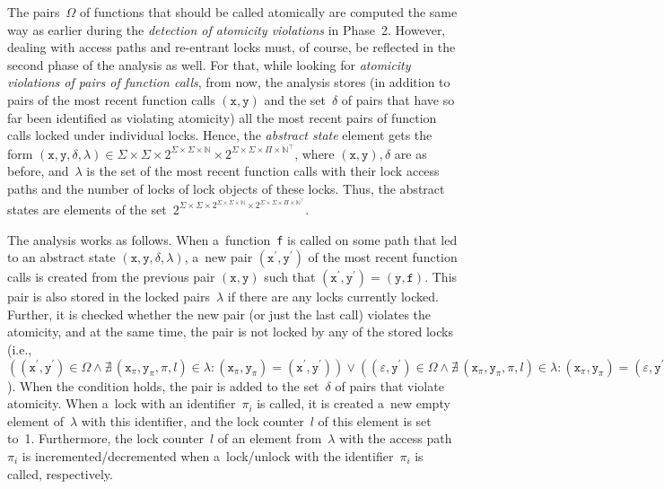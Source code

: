 The pairs~$ \Omega $ of functions that should be called atomically are computed the same way as earlier during the \emph{detection of atomicity violations} in Phase~2. However, dealing with access paths and re-entrant locks must, of course, be reflected in the second phase of the analysis as well. For that, while looking for \emph{atomicity violations of pairs of function calls}, from now, the analysis stores (in addition to pairs of the most recent function calls $ (\mathtt{x}, \mathtt{y}) $ and the set~$ \delta $ of pairs that have so far been identified as violating atomicity) all the most recent pairs of function calls locked under individual locks. Hence, the \emph{abstract state} element gets the form $ (\mathtt{x}, \mathtt{y}, \delta, \lambda) \in \Sigma \times \Sigma \times 2^{\Sigma \times \Sigma \times \mathbb{N}} \times 2^{\Sigma \times \Sigma \times \Pi \times \mathbb{N}^\top} $, where $ (\mathtt{x}, \mathtt{y}), \delta $ are as before, and~$ \lambda $ is the set of the most recent function calls with their lock access paths and the number of locks of lock objects of these locks. Thus, the abstract states are elements of the set~$ 2^{\Sigma \times \Sigma \times 2^{\Sigma \times \Sigma \times \mathbb{N}} \times 2^{\Sigma \times \Sigma \times \Pi \times \mathbb{N}^\top}} $.

The analysis works as follows. When a~function~\texttt{f} is called on some path that led to an abstract state $ (\mathtt{x}, \mathtt{y}, \delta, \lambda) $, a~new pair $ (\mathtt{x}^\prime, \mathtt{y}^\prime) $ of the most recent function calls is created from the previous pair $ (\mathtt{x}, \mathtt{y}) $ such that $ (\mathtt{x}^\prime, \mathtt{y}^\prime) = (\mathtt{y}, \mathtt{f}) $. This pair is also stored in the locked pairs~$ \lambda $ if there are any locks currently locked. Further, it is checked whether the new pair (or just the last call) violates the atomicity, and at the same time, the pair is not locked by any of the stored locks (i.e., $ ((\mathtt{x}^\prime, \mathtt{y}^\prime) \in \Omega \wedge \nexists\,(\mathtt{x}_\pi, \mathtt{y}_\pi, \pi, l) \in \lambda : (\mathtt{x}_\pi, \mathtt{y}_\pi) = (\mathtt{x}^\prime, \mathtt{y}^\prime)) \vee ((\varepsilon, \mathtt{y}^\prime) \in \Omega \wedge \nexists\,(\mathtt{x}_\pi, \mathtt{y}_\pi, \pi, l) \in \lambda : (\mathtt{x}_\pi, \mathtt{y}_\pi) = (\varepsilon, \mathtt{y}^\prime)) $). When the condition holds, the pair is added to the set~$ \delta $ of pairs that violate atomicity. When a~lock with an identifier~$ \pi_i $ is called, it is created a~new empty element of~$ \lambda $ with this identifier, and the lock counter~$ l $ of this element is set to~1. Furthermore, the lock counter~$ l $ of an element from~$ \lambda $ with the access path~$ \pi_i $ is incremented/decremented when a~lock/unlock with the identifier~$ \pi_i $ is called, respectively.

